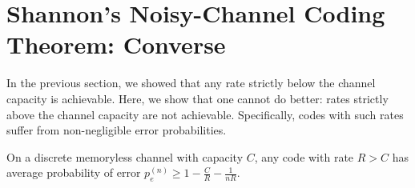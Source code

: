 \section{Shannon's Noisy-Channel Coding Theorem: Converse}
In the previous section, we showed that any rate strictly below the channel capacity is achievable. Here, we show that one cannot do better: rates strictly above the channel capacity are not achievable. Specifically, codes with such rates suffer from non-negligible error probabilities. 

\begin{theorem}\label{thm:ncc-backward}
On a discrete memoryless channel with capacity $C$, any code with rate $R > C$ has average probability of error $p_e^{(n)} \geq 1 - \frac{C}{R} - \frac{1}{nR}$.
\end{theorem}

